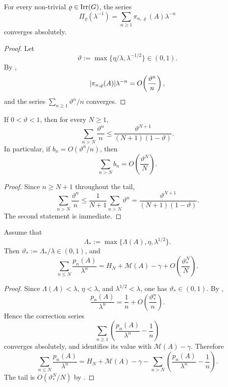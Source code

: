 \begin{lemma}
  \label{lem:nontrivial-perron-point-convergence}
  For every non-trivial \(\varrho\in\operatorname{Irr}(G)\), the series
  \[
    \Pi_\varrho(\lambda^{-1})
    =\sum_{n\ge 1}\pi_{n,\varrho}(A)\lambda^{-n}
  \]
  converges absolutely.
\end{lemma}

\begin{proof}
  Let
  \[
    \vartheta:=\max\{\eta/\lambda,\lambda^{-1/2}\}\in(0,1).
  \]
  By ,
  \[
    \lvert \pi_{n,\varrho}(A) \rvert\lambda^{-n}
    =O\!\left(\frac{\vartheta^n}{n}\right),
  \]
  and the series \(\sum_{n\ge 1}\vartheta^n/n\) converges.
\end{proof}

\begin{lemma}
  \label{lem:geometric-harmonic-tail}
  If \(0<\vartheta<1\), then for every \(N\ge 1\),
  \[
    \sum_{n>N}\frac{\vartheta^n}{n}
    \le
    \frac{\vartheta^{N+1}}{(N+1)(1-\vartheta)}.
  \]
  In particular, if \(b_n=O(\vartheta^n/n)\), then
  \[
    \sum_{n>N}b_n=O\!\left(\frac{\vartheta^N}{N}\right).
  \]
\end{lemma}

\begin{proof}
  Since \(n\ge N+1\) throughout the tail,
  \[
    \sum_{n>N}\frac{\vartheta^n}{n}
    \le
    \frac{1}{N+1}\sum_{n>N}\vartheta^n
    =
    \frac{\vartheta^{N+1}}{(N+1)(1-\vartheta)}.
  \]
  The second statement is immediate.
\end{proof}

\begin{lemma}
  \label{lem:perron-channel-contribution}
  Assume that
  \[
    \Lambda_*:=\max\{\Lambda(A),\eta,\lambda^{1/2}\}.
  \]
  Then \(\vartheta_*:=\Lambda_*/\lambda\in(0,1)\), and
  \[
    \sum_{n\le N}\frac{p_n(A)}{\lambda^n}
    =
    H_N+\mathcal M(A)-\gamma
    +O\!\left(\frac{\vartheta_*^N}{N}\right).
  \]
\end{lemma}

\begin{proof}
  Since \(\Lambda(A)<\lambda\), \(\eta<\lambda\), and
  \(\lambda^{1/2}<\lambda\), one has \(\vartheta_*\in(0,1)\). By
  ,
  \[
    \frac{p_n(A)}{\lambda^n}
    =
    \frac{1}{n}
    +O\!\left(\frac{\vartheta_*^n}{n}\right).
  \]
  Hence the correction series
  \[
    \sum_{n\ge 1}\left(\frac{p_n(A)}{\lambda^n}-\frac{1}{n}\right)
  \]
  converges absolutely, and 
  identifies its value with \(\mathcal M(A)-\gamma\). Therefore
  \[
    \sum_{n\le N}\frac{p_n(A)}{\lambda^n}
    =
    H_N+\mathcal M(A)-\gamma
    -\sum_{n>N}\left(\frac{p_n(A)}{\lambda^n}-\frac{1}{n}\right).
  \]
  The tail is \(O(\vartheta_*^N/N)\) by
  .
\end{proof}


